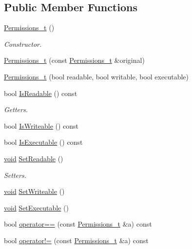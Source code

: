 \subsection*{Public Member Functions}
\begin{DoxyCompactItemize}
\item 
\hyperlink{struct_permissions__t_a99a9cc15dcd67cfb61e0ac9201c1ac91}{Permissions\+\_\+t} ()
\begin{DoxyCompactList}\small\item\em Constructor. \end{DoxyCompactList}\item 
\hyperlink{struct_permissions__t_a0fb1f01d9d9eeb492e892f67efc1f68e}{Permissions\+\_\+t} (const \hyperlink{struct_permissions__t}{Permissions\+\_\+t} \&original)
\item 
\hyperlink{struct_permissions__t_ad331fa142a5fcc4dbf7f2d94c6d6dfcb}{Permissions\+\_\+t} (bool readable, bool writable, bool executable)
\item 
bool \hyperlink{struct_permissions__t_a21f8f18f252971bd2e3c7c1e912f557a}{Is\+Readable} () const 
\begin{DoxyCompactList}\small\item\em Getters. \end{DoxyCompactList}\item 
bool \hyperlink{struct_permissions__t_a38cb01fce5388924d41c53569a9c93a8}{Is\+Writeable} () const 
\item 
bool \hyperlink{struct_permissions__t_ae8020145a967bc9187039830dfb1b8e0}{Is\+Executable} () const 
\item 
\hyperlink{_t_e_m_p_l_a_t_e__cdef_8h_ac9c84fa68bbad002983e35ce3663c686}{void} \hyperlink{struct_permissions__t_a3abe5fbf2146af30e61c75d37f56509b}{Set\+Readable} ()
\begin{DoxyCompactList}\small\item\em Setters. \end{DoxyCompactList}\item 
\hyperlink{_t_e_m_p_l_a_t_e__cdef_8h_ac9c84fa68bbad002983e35ce3663c686}{void} \hyperlink{struct_permissions__t_a9f7e99469cc73979321fd705ebe5c931}{Set\+Writeable} ()
\item 
\hyperlink{_t_e_m_p_l_a_t_e__cdef_8h_ac9c84fa68bbad002983e35ce3663c686}{void} \hyperlink{struct_permissions__t_a5c10ec497edb3cb65afc605c9e786239}{Set\+Executable} ()
\item 
bool \hyperlink{struct_permissions__t_a2c082e70099120968988432487cbc3c8}{operator==} (const \hyperlink{struct_permissions__t}{Permissions\+\_\+t} \&a) const 
\item 
bool \hyperlink{struct_permissions__t_a721001936bffe2f623f43db167271853}{operator!=} (const \hyperlink{struct_permissions__t}{Permissions\+\_\+t} \&a) const 
\end{DoxyCompactItemize}
